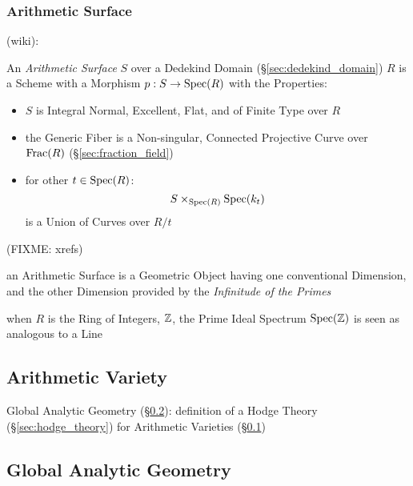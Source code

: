 
\subsubsection{Arithmetic Surface}\label{sec:arithmetic_surface}

(wiki):

An \emph{Arithmetic Surface} $S$ over a Dedekind Domain
(\S\ref{sec:dedekind_domain}) $R$ is a Scheme with a Morphism $p : S \rightarrow
\mathrm{Spec}(R)$ with the Properties:
\begin{itemize}
  \item $S$ is Integral Normal, Excellent, Flat, and of Finite Type over $R$
  \item the Generic Fiber is a Non-singular, Connected Projective Curve over
    $\mathrm{Frac}(R)$ (\S\ref{sec:fraction_field})
  \item for other $t \in \mathrm{Spec}(R)$:
    \[
      S \times_{\mathrm{Spec}(R)} \mathrm{Spec}(k_t)
    \]
    is a Union of Curves over $R / t$
\end{itemize}
(FIXME: xrefs)

an Arithmetic Surface is a Geometric Object having one conventional Dimension,
and the other Dimension provided by the \emph{Infinitude of the Primes}

when $R$ is the Ring of Integers, $\mathbb{Z}$, the Prime Ideal Spectrum
$\mathrm{Spec}(\mathbb{Z})$ is seen as analogous to a Line



\subsection{Arithmetic Variety}\label{sec:arithmetic_variety}

Global Analytic Geometry (\S\ref{sec:global_analytic_geometry}): definition of
a Hodge Theory (\S\ref{sec:hodge_theory}) for Arithmetic Varieties
(\S\ref{sec:arithmetic_variety})



\subsection{Global Analytic Geometry}\label{sec:global_analytic_geometry}


